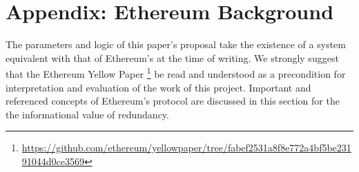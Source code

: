 \documentclass[11pt]{article}
\theoremstyle{plain}
\begin{document}








\pagebreak
\section{\normalsize{Appendix: Ethereum Background}}\label{sec: appendix}

The parameters and logic of this paper's proposal take the existence of a
system equivalent with that of Ethereum's at the time of writing.
We strongly suggest that the Ethereum Yellow Paper\nolinebreak
\footnote{\url{https://github.com/ethereum/yellowpaper/tree/fabef2531a8f8e772a4bf5be23191044d0ce3569}}
be read and understood as a precondition for interpretation and evaluation
of the work of this project.
Important and referenced concepts of Ethereum's protocol are discussed in this 
section for the the informational value of redundancy.
\end{document}
